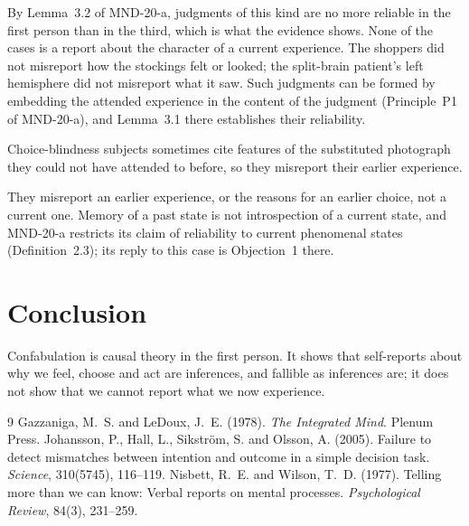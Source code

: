 \documentclass{situationist-preprint}
\begin{document}
By Lemma~3.2 of MND-20-a, judgments of this kind are no more reliable in the first person than in the third, which is what the evidence shows. None of the cases is a report about the character of a current experience. The shoppers did not misreport how the stockings felt or looked; the split-brain patient's left hemisphere did not misreport what it saw. Such judgments can be formed by embedding the attended experience in the content of the judgment (Principle~P1 of MND-20-a), and Lemma~3.1 there establishes their reliability.

\begin{objection}
Choice-blindness subjects sometimes cite features of the substituted photograph they could not have attended to before, so they misreport their earlier experience.
\end{objection}

\begin{reply}
They misreport an earlier experience, or the reasons for an earlier choice, not a current one. Memory of a past state is not introspection of a current state, and MND-20-a restricts its claim of reliability to current phenomenal states (Definition~2.3); its reply to this case is Objection~1 there.
\end{reply}

\section{Conclusion}

Confabulation is causal theory in the first person. It shows that self-reports about why we feel, choose and act are inferences, and fallible as inferences are; it does not show that we cannot report what we now experience.

\begin{thebibliography}{9}\small
{} Gazzaniga, M.~S. and LeDoux, J.~E. (1978). \emph{The Integrated Mind}. Plenum Press.
 Johansson, P., Hall, L., Sikstr\"om, S. and Olsson, A. (2005). Failure to detect mismatches between intention and outcome in a simple decision task. \emph{Science}, 310(5745), 116--119.
 Nisbett, R.~E. and Wilson, T.~D. (1977). Telling more than we can know: Verbal reports on mental processes. \emph{Psychological Review}, 84(3), 231--259.
\end{thebibliography}
\end{document}
